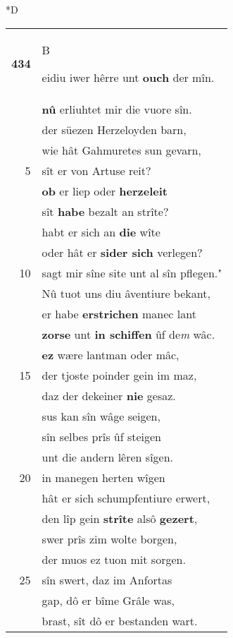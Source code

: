 \documentclass[8pt,a4paper,notitlepage]{article}
\begin{document}
\begin{table}[ht]
\begin{minipage}[t]{0.5\linewidth}
\small
\begin{center}*D
\end{center}
\begin{tabular}{rl}
\textbf{434} & \begin{large}B\end{large}eidiu iwer hêrre unt \textbf{ouch} der mîn.\\ 
 & \textbf{nû} erliuhtet mir die vuore sîn.\\ 
 & der süezen Herzeloyden barn,\\ 
 & wie hât Gahmuretes sun gevarn,\\ 
5 & sît er von Artuse reit?\\ 
 & \textbf{ob} er liep oder \textbf{herzeleit}\\ 
 & sît \textbf{habe} bezalt an strîte?\\ 
 & habt er sich an \textbf{die} wîte\\ 
 & oder hât er \textbf{sider sich} verlegen?\\ 
10 & sagt mir sîne site unt al sîn pflegen."\\ 
 & Nû tuot uns diu âventiure bekant,\\ 
 & er habe \textbf{erstrichen} manec lant\\ 
 & \textbf{zorse} unt \textbf{in schiffen} ûf de\textit{m} wâc.\\ 
 & \textbf{ez} wære lantman oder mâc,\\ 
15 & der tjoste poinder gein im maz,\\ 
 & daz der dekeiner \textbf{nie} gesaz.\\ 
 & sus kan sîn wâge seigen,\\ 
 & sîn selbes prîs ûf steigen\\ 
 & unt die andern lêren sîgen.\\ 
20 & in manegen herten wîgen\\ 
 & hât er sich schumpfentiure erwert,\\ 
 & den lîp gein \textbf{strîte} alsô \textbf{gezert},\\ 
 & swer prîs zim wolte borgen,\\ 
 & der muos ez tuon mit sorgen.\\ 
25 & sîn swert, daz im Anfortas\\ 
 & gap, dô er bîme Grâle was,\\ 
 & brast, sît dô er bestanden wart.\\ 

\end{tabular}
\end{minipage}
\end{table}
\end{document}
